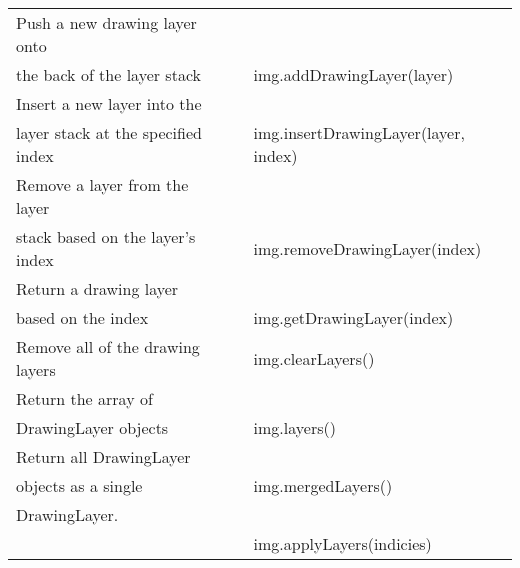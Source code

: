 \documentclass[a4paper,landscape,8pt]{article}
\begin{document}
\begin{flushleft}
\begin{tabular}{llll}
 Push a new drawing layer onto\\
 the back of the layer stack& & & img.addDrawingLayer(layer)\\[0.3cm]
 Insert a new layer into the \\
 layer stack at the specified index & & & img.insertDrawingLayer(layer, index)\\[0.3cm]
 Remove a layer from the layer \\
 stack based on the layer's index& & &img.removeDrawingLayer(index)\\[0.3cm]
 Return a drawing layer\\ 
 based on the index& & & img.getDrawingLayer(index)\\[0.3cm]
 Remove all of the drawing layers& & &img.clearLayers()\\[0.3cm]
 Return the array of \\
 DrawingLayer objects & & & img.layers()\\[0.3cm]
 Return all DrawingLayer \\
 objects as a single &&&img.mergedLayers()\\
 DrawingLayer.\\[0.3cm]
 & & & img.applyLayers(indicies)\\[0.3cm]
 \end{tabular}

\end{flushleft}
\end{document}
